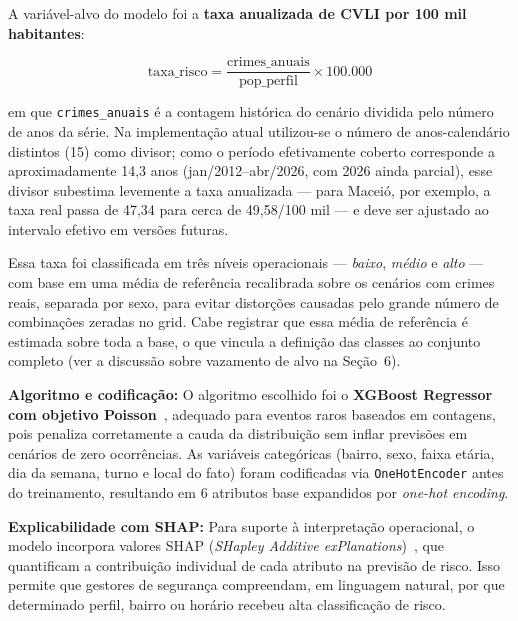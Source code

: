 \documentclass[12pt]{article}
\begin{document}
A variável-alvo do modelo foi a \textbf{taxa anualizada de CVLI por
100 mil habitantes}:

\begin{equation}
\text{taxa\_risco} = \frac{\text{crimes\_anuais}}{\text{pop\_perfil}}
  \times 100.000
\end{equation}

em que \texttt{crimes\_anuais} é a contagem histórica do cenário dividida
pelo número de anos da série. Na implementação atual utilizou-se o número de
anos-calendário distintos (15) como divisor; como o período efetivamente
coberto corresponde a aproximadamente 14,3 anos (jan/2012--abr/2026, com 2026
ainda parcial), esse divisor subestima levemente a taxa anualizada --- para
Maceió, por exemplo, a taxa real passa de 47,34 para cerca de 49,58/100 mil ---
e deve ser ajustado ao intervalo efetivo em versões futuras.

Essa taxa foi classificada em três níveis operacionais ---
\textit{baixo}, \textit{médio} e \textit{alto} --- com base em uma média de
referência recalibrada sobre os cenários com crimes reais, separada por sexo,
para evitar distorções causadas pelo grande número de combinações zeradas no
grid. Cabe registrar que essa média de referência é estimada sobre toda a
base, o que vincula a definição das classes ao conjunto completo (ver a
discussão sobre vazamento de alvo na Seção~6).

\textbf{Algoritmo e codificação:} O algoritmo escolhido foi o
\textbf{XGBoost Regressor com objetivo Poisson}~\cite{chen:2016}, adequado
para eventos raros baseados em contagens, pois penaliza corretamente a cauda
da distribuição sem inflar previsões em cenários de zero ocorrências. As
variáveis categóricas (bairro, sexo, faixa etária, dia da semana, turno e
local do fato) foram codificadas via \texttt{OneHotEncoder} antes do
treinamento, resultando em 6 atributos base expandidos por
\textit{one-hot encoding}.

\textbf{Explicabilidade com SHAP:} Para suporte à interpretação operacional,
o modelo incorpora valores SHAP (\textit{SHapley Additive
exPlanations})~\cite{lundberg:2017}, que quantificam a contribuição individual
de cada atributo na previsão de risco. Isso permite que gestores de segurança
compreendam, em linguagem natural, por que determinado perfil, bairro ou
horário recebeu alta classificação de risco.
\end{document}
